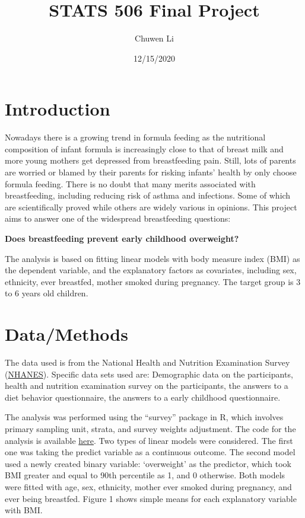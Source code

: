 \documentclass[
]{article}
\title{STATS 506 Final Project}
\author{Chuwen Li}
\date{12/15/2020}
\begin{document}
\maketitle

\hypertarget{introduction}{%
\section{\texorpdfstring{\protect\hypertarget{jump}{}{Introduction}}{Introduction}}\label{introduction}}

Nowadays there is a growing trend in formula feeding as the nutritional
composition of infant formula is increasingly close to that of breast
milk and more young mothers get depressed from breastfeeding pain.
Still, lots of parents are worried or blamed by their parents for
risking infants' health by only choose formula feeding. There is no
doubt that many merits associated with breastfeeding, including reducing
risk of asthma and infections. Some of which are scientifically proved
while others are widely various in opinions. This project aims to answer
one of the widespread breastfeeding questions:

\textbf{Does breastfeeding prevent early childhood overweight?}

The analysis is based on fitting linear models with body measure index
(BMI) as the dependent variable, and the explanatory factors as
covariates, including sex, ethnicity, ever breastfed, mother smoked
during pregnancy. The target group is 3 to 6 years old children.

\hypertarget{datamethods}{%
\section{Data/Methods}\label{datamethods}}

The data used is from the National Health and Nutrition Examination
Survey
(\href{https://wwwn.cdc.gov/nchs/nhanes/continuousnhanes/default.aspx?BeginYear=2017}{NHANES}).
Specific data sets used are: Demographic data on the participants,
health and nutrition examination survey on the participants, the answers
to a diet behavior questionnaire, the answers to a early childhood
questionnaire.

The analysis was performed using the ``survey'' package in R, which
involves primary sampling unit, strata, and survey weights adjustment.
The code for the analysis is available
\href{https://github.com/lixx4228/Stats506_public}{here}. Two types of
linear models were considered. The first one was taking the predict
variable as a continuous outcome. The second model used a newly created
binary variable: `overweight' as the predictor, which took BMI greater
and equal to 90th percentile as 1, and 0 otherwise. Both models were
fitted with age, sex, ethnicity, mother ever smoked during pregnancy,
and ever being breastfed. Figure 1 shows simple means for each
explanatory variable with BMI.
\end{document}
